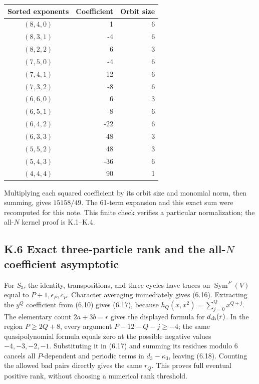 \documentclass[a4paper,11pt]{article}
\numberwithin{equation}{section}
\begin{document}
\begin{longtable}[]{@{}crr@{}}
\toprule\noalign{}
Sorted exponents & Coefficient & Orbit size \\
\midrule\noalign{}
\endhead
\bottomrule\noalign{}
\endlastfoot
\((8,4,0)\) & 1 & 6 \\
\((8,3,1)\) & -4 & 6 \\
\((8,2,2)\) & 6 & 3 \\
\((7,5,0)\) & -4 & 6 \\
\((7,4,1)\) & 12 & 6 \\
\((7,3,2)\) & -8 & 6 \\
\((6,6,0)\) & 6 & 3 \\
\((6,5,1)\) & -8 & 6 \\
\((6,4,2)\) & -22 & 6 \\
\((6,3,3)\) & 48 & 3 \\
\((5,5,2)\) & 48 & 3 \\
\((5,4,3)\) & -36 & 6 \\
\((4,4,4)\) & 90 & 1 \\
\end{longtable}

Multiplying each squared coefficient by its orbit size and monomial norm, then summing, gives \(15158/49\). The 61-term expansion and this exact sum were recomputed for this note. This finite check verifies a particular normalization; the all-\(N\) kernel proof is K.1--K.4.

\hypertarget{k.6-exact-three-particle-rank-and-the-all-n-coefficient-asymptotic}{%
\subsection{\texorpdfstring{K.6 Exact three-particle rank and the all-\(N\) coefficient asymptotic}{K.6 Exact three-particle rank and the all-N coefficient asymptotic}}\label{k.6-exact-three-particle-rank-and-the-all-n-coefficient-asymptotic}}

For \(S_3\), the identity, transpositions, and three-cycles have traces on \(\operatorname{Sym}^P(V)\) equal to \(P+1,\epsilon_P,c_P\). Character averaging immediately gives (6.16). Extracting the \(y^Q\) coefficient from (6.10) gives (6.17), because \(h_Q(x,x^2)=\sum_{j=0}^Qx^{Q+j}\). The elementary count \(2a+3b=r\) gives the displayed formula for \(d_{\rm ch}(r)\). In the region \(P\ge2Q+8\), every argument \(P-12-Q-j\ge-4\); the same quasipolynomial formula equals zero at the possible negative values \(-4,-3,-2,-1\). Substituting it in (6.17) and summing its residues modulo 6 cancels all \(P\)-dependent and periodic terms in \(d_3-\kappa_3\), leaving (6.18). Counting the allowed bad pairs directly gives the same \(r_Q\). This proves full eventual positive rank, without choosing a numerical rank threshold.
\end{document}
